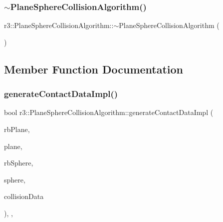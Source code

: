 \subsubsection{\texorpdfstring{$\sim$\+Plane\+Sphere\+Collision\+Algorithm()}{~PlaneSphereCollisionAlgorithm()}}
{\footnotesize\ttfamily r3\+::\+Plane\+Sphere\+Collision\+Algorithm\+::$\sim$\+Plane\+Sphere\+Collision\+Algorithm (\begin{DoxyParamCaption}{ }\end{DoxyParamCaption})\hspace{0.3cm}{\ttfamily [default]}}



\subsection{Member Function Documentation}
\mbox{\label{classr3_1_1_plane_sphere_collision_algorithm_a6823dc80b23ce77beabd26a9c2a9d9ed}} 
\subsubsection{\texorpdfstring{generate\+Contact\+Data\+Impl()}{generateContactDataImpl()}}
{\footnotesize\ttfamily bool r3\+::\+Plane\+Sphere\+Collision\+Algorithm\+::generate\+Contact\+Data\+Impl (\begin{DoxyParamCaption}\item[{\mbox{\hyperlink{classr3_1_1_rigid_body}{Rigid\+Body}} $\ast$}]{rb\+Plane,  }\item[{\mbox{\hyperlink{classr3_1_1_collision_plane}{Collision\+Plane}} $\ast$}]{plane,  }\item[{\mbox{\hyperlink{classr3_1_1_rigid_body}{Rigid\+Body}} $\ast$}]{rb\+Sphere,  }\item[{\mbox{\hyperlink{classr3_1_1_collision_sphere}{Collision\+Sphere}} $\ast$}]{sphere,  }\item[{\mbox{\hyperlink{classr3_1_1_collision_data}{Collision\+Data}} \&}]{collision\+Data }\end{DoxyParamCaption})\hspace{0.3cm}{\ttfamily [override]}, {\ttfamily [protected]}, {\ttfamily [virtual]}}

